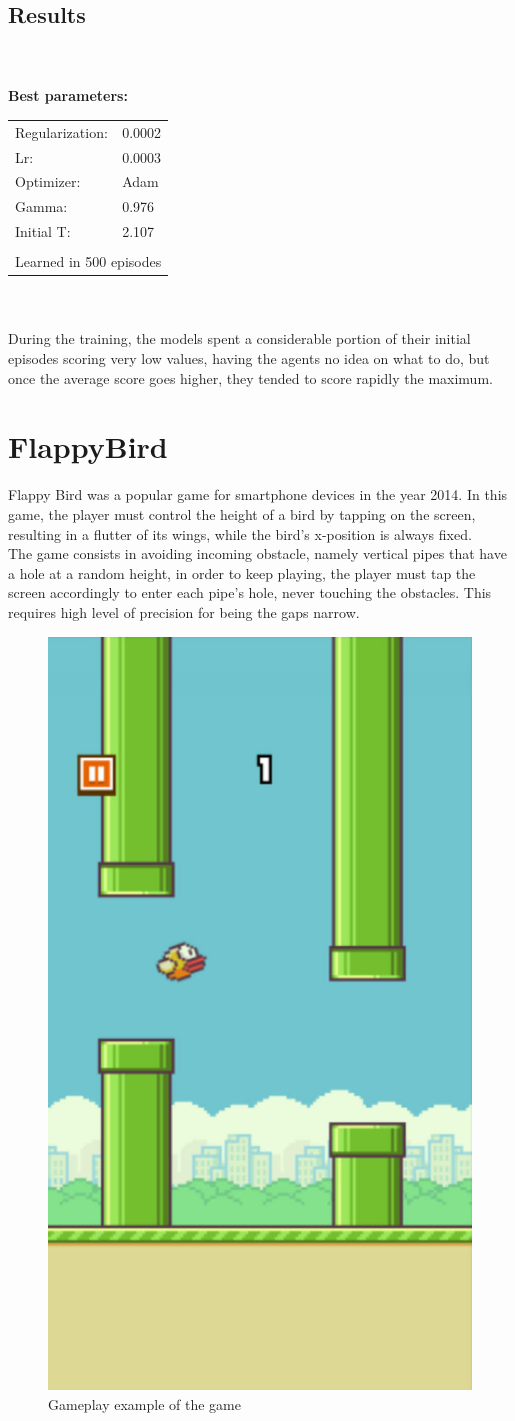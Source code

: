 \documentclass[11pt,a4paper,twocolumn]{IEEEtran}
\newcommand{\thinsepline}{\noindent\makebox[\linewidth]{\rule{7.5cm}{0.02pt}}}
\begin{document}
		\subsection{\textbf{Results}}\text{   }\\
		\thinsepline\\
		\textbf{Best parameters:}\medskip\\
		\begin{tabular}{ll}
			Regularization: & 0.0002 \\
			Lr: & 0.0003 \\
			Optimizer: & Adam \\
			Gamma: & 0.976 \\
			Initial T:& 2.107 \\
			\hline\\
			\multicolumn{2}{l}{Learned in 500 episodes}
		\end{tabular}\\
		\thinsepline\medskip\\
		During the training, the models spent a considerable portion of their initial episodes scoring very low values, having the agents no idea on what to do, but once the average score goes higher, they tended to score rapidly the maximum.
	\section{\textbf{FlappyBird}}
		Flappy Bird was a popular game for smartphone devices in the year 2014. In this game, the player must control the height of a bird by tapping on the screen, resulting in a flutter of its wings, while the bird's x-position is always fixed.\\ The game consists in avoiding incoming obstacle, namely vertical pipes that have a hole at a random height, in order to keep playing, the player must tap the screen accordingly to enter each pipe's hole, never touching the obstacles. This requires high level of precision for being the gaps narrow.\vspace*{-.2cm}
		\begin{figure}[h]
			\centering
			\includegraphics[width=0.35\linewidth]{../imgs/gameplay.jpeg}
			\caption{Gameplay example of the game}
		\end{figure}\vspace*{-1cm}\\
\end{document}
